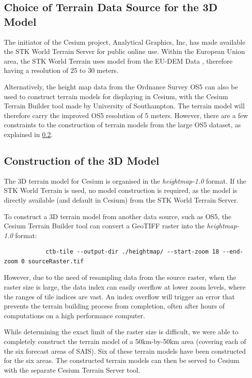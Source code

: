 \documentclass[11pt, oneside]{article}
\begin{document}
	\subsection{Choice of Terrain Data Source for the 3D Model}
	
	 	The initiator of the Cesium project, Analytical Graphics, Inc, has made available the STK World Terrain Server \cite{stk-world-terrain} for public online use. Within the European Union area, the STK World Terrain uses model from the EU-DEM Data \cite{eu-dem}, therefore having a resolution of 25 to 30 meters. 
		
		Alternatively, the height map data from the Ordnance Survey OS5 \cite{os-5} can also be used to construct terrain models for displaying in Cesium, with the Cesium Terrain Builder \cite{cesium-terrain-builder} tool made by University of Southampton. The terrain model will therefore carry the improved OS5 resolution of 5 meters. However, there are a few constraints to the construction of terrain models from the large OS5 dataset, as explained in \ref{subsec:construction}.
		
	\subsection{Construction of the 3D Model} \label{subsec:construction}
		
		The 3D terrain model for Cesium is organised in the \textit{heightmap-1.0}\cite{heightmap} format. If the STK World Terrain is used, no model construction is required, as the model is directly available (and default in Cesium) from the STK World Terrain Server. 
		
		To construct a 3D terrain model from another data source, such as OS5, the Cesium Terrain Builder tool can convert a GeoTIFF raster into the \textit{heightmap-1.0} format:
		\begin{verbatim}
			ctb-tile --output-dir ./heightmap/ --start-zoom 18 --end-zoom 0 sourceRaster.tif
		\end{verbatim}
		
		However, due to the need of resampling data from the source raster, when the raster size is large, the data index can easily overflow at lower zoom levels, where the ranges of tile indices are vast.  An index overflow will trigger an error that prevents the terrain building process from completion, often after hours of computations on a high performance computer. 
		
		While determining the exact limit of the raster size is difficult, we were able to completely construct the terrain model of a 50km-by-50km area (covering each of the six forecast areas of SAIS). Six of these terrain models have been constructed for the six areas. The constructed terrain models can then be served to Cesium with the separate Cesium Terrain Server \cite{cesium-terrain-server} tool.
		
\end{document}

